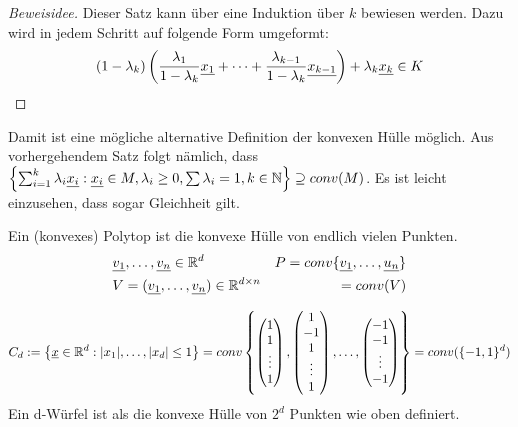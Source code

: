 \begin{proof}[Beweisidee]
Dieser Satz kann über eine Induktion über $k$ bewiesen werden. Dazu wird in jedem Schritt 
auf folgende Form umgeformt:
\begin{align*}
(1-\lambda_k)\left(\frac{\lambda_1}{1-\lambda_k}\ul{x_1}+\dots+%
                \frac{\lambda_{k-1}}{1-\lambda_k}\ul{x_{k-1}}\right)+\lambda_k\ul{x_k} \in K
\end{align*}
\end{proof}
Damit ist eine mögliche alternative Definition der konvexen Hülle möglich. Aus vorhergehendem Satz
folgt nämlich, dass $\left\{\sum_{i=1}^k\lambda_i\underline{x_i}:\underline{x_i}\in M, \lambda_i\geq0, 
    \sum\lambda_i=1, k\in\mathbb{N}\right\}\supseteq conv(M)$. Es ist leicht einzusehen, dass sogar 
Gleichheit gilt. 

\begin{defi}
Ein (konvexes) Polytop ist die konvexe Hülle von endlich vielen Punkten.
\begin{align*}
&\underline{v_1},\dots,\underline{v_n}\in\mathbb{R}^d                &P=conv\{\underline{v_1},\dots,\underline{u_n}\} \\
&V=(\underline{v_1},\dots,\underline{v_n})\in\mathbb{R}^{d\times n}  & =conv(V) 
\end{align*}
\end{defi}

\begin{bsp}[d-Würfel]
\begin{equation*}
    C_d:=\left\{\ul{x}\in\bbR^d:|x_1|,\dots,|x_d|\leq1\right\}%
    =conv\left\{\begin{pmatrix}1\\1\\\vdots\\1\end{pmatrix},
                \begin{pmatrix}1\\-1\\1\\\vdots\\1\end{pmatrix},
                \dots,
                \begin{pmatrix}-1\\-1\\\vdots\\-1\end{pmatrix} \right\}=conv(\{-1, 1\}^d) 
\end{equation*}
Ein d-Würfel ist als die konvexe Hülle von $2^d$ Punkten wie oben definiert.
\end{bsp}

